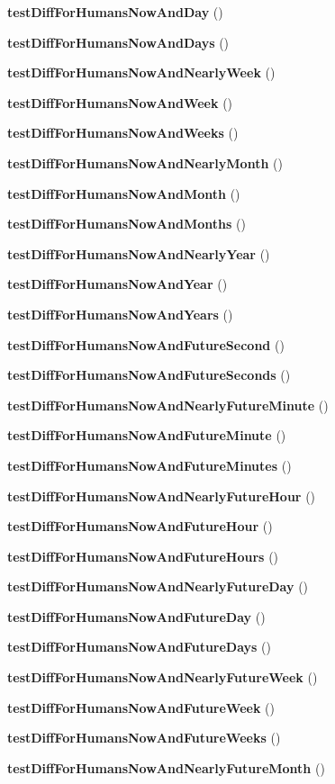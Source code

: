 \begin{DoxyCompactItemize}
{\bf test\+Diff\+For\+Humans\+Now\+And\+Day} ()
\item 
{\bf test\+Diff\+For\+Humans\+Now\+And\+Days} ()
\item 
{\bf test\+Diff\+For\+Humans\+Now\+And\+Nearly\+Week} ()
\item 
{\bf test\+Diff\+For\+Humans\+Now\+And\+Week} ()
\item 
{\bf test\+Diff\+For\+Humans\+Now\+And\+Weeks} ()
\item 
{\bf test\+Diff\+For\+Humans\+Now\+And\+Nearly\+Month} ()
\item 
{\bf test\+Diff\+For\+Humans\+Now\+And\+Month} ()
\item 
{\bf test\+Diff\+For\+Humans\+Now\+And\+Months} ()
\item 
{\bf test\+Diff\+For\+Humans\+Now\+And\+Nearly\+Year} ()
\item 
{\bf test\+Diff\+For\+Humans\+Now\+And\+Year} ()
\item 
{\bf test\+Diff\+For\+Humans\+Now\+And\+Years} ()
\item 
{\bf test\+Diff\+For\+Humans\+Now\+And\+Future\+Second} ()
\item 
{\bf test\+Diff\+For\+Humans\+Now\+And\+Future\+Seconds} ()
\item 
{\bf test\+Diff\+For\+Humans\+Now\+And\+Nearly\+Future\+Minute} ()
\item 
{\bf test\+Diff\+For\+Humans\+Now\+And\+Future\+Minute} ()
\item 
{\bf test\+Diff\+For\+Humans\+Now\+And\+Future\+Minutes} ()
\item 
{\bf test\+Diff\+For\+Humans\+Now\+And\+Nearly\+Future\+Hour} ()
\item 
{\bf test\+Diff\+For\+Humans\+Now\+And\+Future\+Hour} ()
\item 
{\bf test\+Diff\+For\+Humans\+Now\+And\+Future\+Hours} ()
\item 
{\bf test\+Diff\+For\+Humans\+Now\+And\+Nearly\+Future\+Day} ()
\item 
{\bf test\+Diff\+For\+Humans\+Now\+And\+Future\+Day} ()
\item 
{\bf test\+Diff\+For\+Humans\+Now\+And\+Future\+Days} ()
\item 
{\bf test\+Diff\+For\+Humans\+Now\+And\+Nearly\+Future\+Week} ()
\item 
{\bf test\+Diff\+For\+Humans\+Now\+And\+Future\+Week} ()
\item 
{\bf test\+Diff\+For\+Humans\+Now\+And\+Future\+Weeks} ()
\item 
{\bf test\+Diff\+For\+Humans\+Now\+And\+Nearly\+Future\+Month} ()

\end{DoxyCompactItemize}

